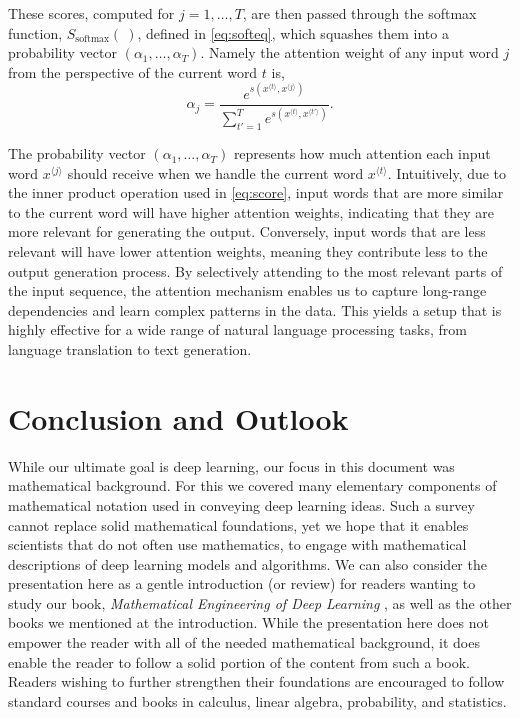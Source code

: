 \documentclass[12pt]{article}
\begin{document}
These scores, computed for $j = 1,\ldots,T$, are then passed through the softmax function, $S_{\text{softmax}}(~)$, defined in \eqref{eq:softeq}, which squashes them into a probability vector $(\alpha_1, \ldots, \alpha_T)$. Namely the attention weight of any input word $j$ from the perspective of the current word $t$ is,
%
\begin{equation}
\label{eq:attentionweight}
\alpha_{j} = \frac{e^{s(x^{{\langle t \rangle}},x^{{\langle j \rangle}})}}{\sum_{t'=1}^T e^{s(x^{{\langle t \rangle}},x^{{\langle t' \rangle}})}}.
\end{equation}
%

The probability vector $(\alpha_1, \ldots, \alpha_T)$ represents how much attention each input word $x^{{\langle j \rangle}}$ should receive when we handle the current word $x^{{\langle t \rangle}}$. Intuitively, due to the inner product operation used in \eqref{eq:score}, input words that are more similar to the current word will have higher attention weights, indicating that they are more relevant for generating the output. Conversely, input words that are less relevant will have lower attention weights, meaning they contribute less to the output generation process. By selectively attending to the most relevant parts of the input sequence, the attention mechanism enables us to capture long-range dependencies and learn complex patterns in the data. This yields a setup that is highly effective for a wide range of natural language processing tasks, from language translation to text generation.

\section{Conclusion and Outlook}
\label{sec:conclusion}
While our ultimate goal is deep learning, our focus in this document was mathematical background. For this we covered many elementary components of mathematical notation used in conveying deep learning ideas. Such a survey cannot replace solid mathematical foundations, yet we hope that it enables scientists that do not often use mathematics, to engage with mathematical descriptions of deep learning models and algorithms. We can also consider the presentation here as a gentle introduction (or review) for readers wanting to study our book, {\em Mathematical Engineering of Deep Learning} \cite{LiquetMokaNazarathy2024DeepLearning}, as well as the other books we mentioned at the introduction. While the presentation here does not empower the reader with all of the needed mathematical background, it does enable the reader to follow a solid portion of the content from such a book. Readers wishing to further strengthen their foundations are encouraged to follow standard courses and books in calculus, linear algebra, probability, and statistics.\footnotemark{}
\end{document}
